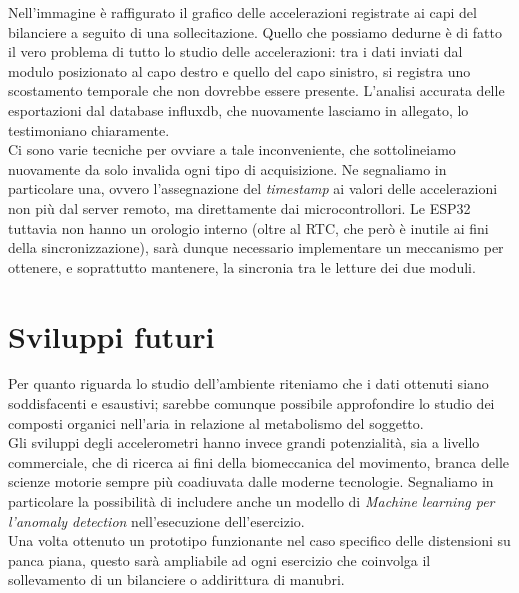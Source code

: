 \documentclass[fleqn,10pt]{SelfArx} %
\begin{document}
\begin{itemize}[noitemsep]
		Nell'immagine è raffigurato il grafico delle accelerazioni registrate ai capi del bilanciere a seguito di una sollecitazione. 
		Quello che possiamo dedurne è di fatto il vero problema di tutto lo studio delle accelerazioni: 
		tra i dati inviati dal modulo posizionato al capo destro e quello del capo sinistro, si registra uno scostamento temporale che 
		non dovrebbe essere presente. L'analisi accurata delle esportazioni dal database influxdb, che nuovamente lasciamo in allegato, 
		lo testimoniano chiaramente.\\
		Ci sono varie tecniche per ovviare a tale inconveniente, che sottolineiamo nuovamente da solo invalida ogni tipo di acquisizione.
		Ne segnaliamo in particolare una, ovvero l'assegnazione del \textit{timestamp} ai valori delle accelerazioni non più dal server 
		remoto, ma direttamente dai microcontrollori. Le ESP32 tuttavia non hanno un orologio interno (oltre al RTC, che però è inutile 
		ai fini della sincronizzazione), sarà dunque necessario implementare un meccanismo per ottenere, e soprattutto mantenere, la 
		sincronia tra le letture dei due moduli.
\end{itemize}

\section{Sviluppi futuri}
Per quanto riguarda lo studio dell'ambiente riteniamo che i dati ottenuti siano soddisfacenti e esaustivi; sarebbe comunque possibile 
approfondire lo studio dei composti organici nell'aria in relazione al metabolismo del soggetto.\\
Gli sviluppi degli accelerometri hanno invece grandi potenzialità, sia a livello commerciale, che di ricerca ai fini della biomeccanica 
del movimento, branca delle scienze motorie sempre più coadiuvata dalle moderne tecnologie. Segnaliamo in particolare la possibilità
di includere anche un modello di \textit{Machine learning per l'anomaly detection} nell'esecuzione dell'esercizio.\\
Una volta ottenuto un prototipo funzionante nel caso specifico delle distensioni su panca piana, questo sarà ampliabile ad ogni 
esercizio che coinvolga il sollevamento di un bilanciere o addirittura di manubri.


% 
% 

\vspace{2cm}
\printbibliography

\end{document}
